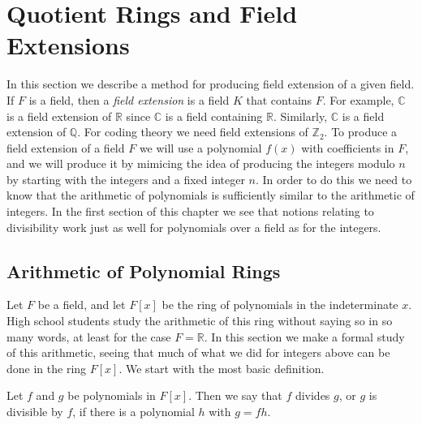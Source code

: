 \chapter{Quotient Rings and Field Extensions}

In this section we describe a method for producing field extension of a given
field. If $F$ is a field, then a
%
\emph{field extension} is a field $K$ that contains $F $. For example,
$\mathbb{C}$ is a field extension of $\mathbb{R}$ since $\mathbb{C}$ is a
field containing $\mathbb{R}$. Similarly, $\mathbb{C}$ is a field extension of
$\mathbb{Q}$. For coding theory we need field extensions of $\mathbb{Z}_{2}$.
To produce a field extension of a field $F$ we will use a polynomial $f(x)$
with coefficients in $F$, and we will produce it by mimicing the idea of
producing the integers modulo $n$ by starting with the integers and a fixed
integer $n$. In order to do this we need to know that the arithmetic of
polynomials is sufficiently similar to the arithmetic of integers. In the
first section of this chapter we see that notions relating to divisibility
work just as well for polynomials over a field as for the integers.

\section{Arithmetic of Polynomial Rings}

Let $F$ be a field, and let $F[x]$ be the ring of polynomials in the
indeterminate $x$. High school students study the arithmetic of this ring
without saying so in so many words, at least for the case $F=\mathbb{R}$. In
this section we make a formal study of this arithmetic, seeing that much of
what we did for integers above can be done in the ring $F[x]$. We start with
the most basic definition.

\begin{definition}
Let $f$ and $g$ be polynomials in $F[x]$. Then we say that $f$ divides $g$, or
$g$ is divisible by $f$, if there is a polynomial $h$ with $g=fh$.
\end{definition}


